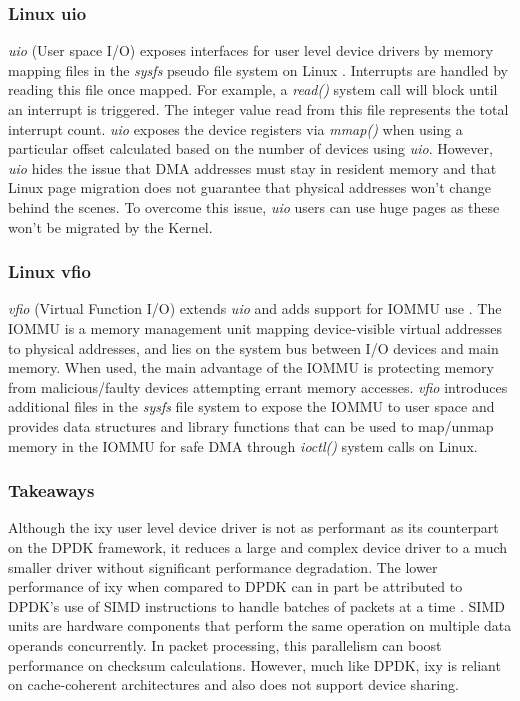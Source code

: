 \subsubsection{Linux uio}
\emph{uio} (User space I/O) exposes interfaces for user level device drivers by memory mapping files in the \emph{sysfs}
pseudo file system on Linux \cite{UIO}. Interrupts are handled by reading this file once mapped. For example,
a \emph{read()} system call will block until an interrupt is triggered. The integer value read from this file represents
the total interrupt count. \emph{uio} exposes the device registers via \emph{mmap()} when using a particular offset calculated
based on the number of devices using \emph{uio}. However, \emph{uio} hides the issue that DMA 
addresses must stay in resident memory and that Linux page migration does not guarantee that physical addresses
won't change behind the scenes. To overcome this issue, \emph{uio} users can use
huge pages as these won't be migrated by the Kernel.

\subsubsection{Linux vfio}
\emph{vfio} (Virtual Function I/O) extends \emph{uio} and adds support for IOMMU use \cite{VFIO}. The IOMMU is a memory
management unit mapping device-visible virtual addresses to physical addresses, and lies on the system bus between I/O devices
and main memory. When used, the main advantage of the IOMMU is protecting memory from malicious/faulty devices attempting
errant memory accesses. \emph{vfio} introduces additional
files in the \emph{sysfs} file system to expose the IOMMU to user space and provides data structures and library functions
that can be used to map/unmap memory in the IOMMU for safe DMA through \emph{ioctl()} system calls on Linux.

\subsubsection{Takeaways}
Although the ixy user level device driver is not as performant as its counterpart on the DPDK framework, it reduces a
large and complex device driver to a much smaller driver without significant performance degradation. The lower
performance of ixy when compared to DPDK can in part be attributed to DPDK's use of SIMD instructions to handle
batches of packets at a time \cite{Emmerich_PBHZC_19}. SIMD units are hardware components that perform the same
operation on multiple data operands concurrently. In packet processing, this parallelism can boost performance
on checksum calculations. However, much like DPDK, ixy is reliant on cache-coherent architectures and also does
not support device sharing.

